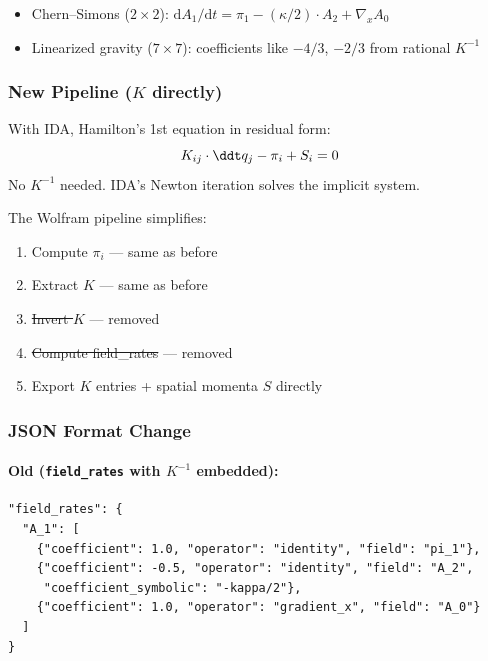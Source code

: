 \begin{itemize}
  \item Chern--Simons ($2\times 2$): $\mathrm{d}A_1/\mathrm{d}t = \pi_1 - (\kappa/2)\cdot A_2 + \nabla_x A_0$
  \item Linearized gravity ($7\times 7$): coefficients like $-4/3$, $-2/3$ from rational $K^{-1}$
\end{itemize}

\subsubsection{New Pipeline ($K$ directly)}
\label{sec:new-pipeline}

With IDA, Hamilton's 1st equation in residual form:
\begin{equation}
  K_{ij} \cdot \ddt q_j - \pi_i + S_i = 0
  \label{eq:hamilton-first-residual}
\end{equation}
No $K^{-1}$ needed. IDA's Newton iteration solves the implicit system.

The Wolfram pipeline simplifies:

\begin{enumerate}
  \item Compute $\pi_i$ --- same as before
  \item Extract $K$ --- same as before
  \item \sout{Invert $K$} --- removed
  \item \sout{Compute field\_rates} --- removed
  \item Export $K$ entries + spatial momenta $S$ directly
\end{enumerate}

\subsubsection{JSON Format Change}
\label{sec:json-format-change}

\paragraph{Old (\texttt{field\_rates} with $K^{-1}$ embedded):}
\label{par:old-json}

\begin{lstlisting}[style=json]
"field_rates": {
  "A_1": [
    {"coefficient": 1.0, "operator": "identity", "field": "pi_1"},
    {"coefficient": -0.5, "operator": "identity", "field": "A_2",
     "coefficient_symbolic": "-kappa/2"},
    {"coefficient": 1.0, "operator": "gradient_x", "field": "A_0"}
  ]
}
\end{lstlisting}


